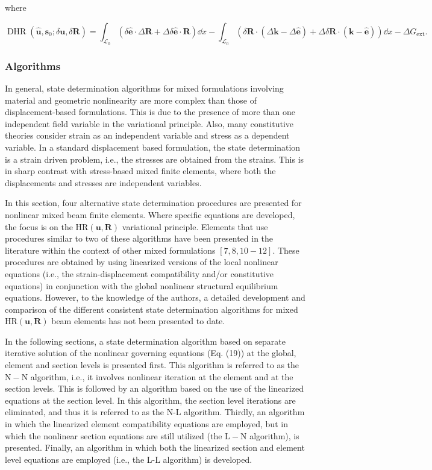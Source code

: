 where

$$
\operatorname{DHR}(\hat{\bm{u}}, \bm{s}_0 ; \delta \bm{u}, \delta \mathbf{R})=\int_{\mathscr{L}_0}(\delta \hat{\bm{e}} \cdot \Delta \mathbf{R}+\Delta \delta \hat{\bm{e}} \cdot \mathbf{R}) \dd x -\int_{\mathscr{L}_0}(\delta \mathbf{R} \cdot(\Delta \mathbf{k}-\Delta \hat{\bm{e}})+\Delta \delta \mathbf{R} \cdot(\mathbf{k}-\hat{\bm{e}})) \dd x-\Delta G_{\mathrm{ext}} .
$$

\subsubsection{Algorithms}

In general, state determination algorithms for mixed formulations involving material and geometric nonlinearity are more complex than those of displacement-based formulations. This is due to the presence of more than one independent field variable in the variational principle. Also, many constitutive theories consider strain as an independent variable and stress as a dependent variable. In a standard displacement based formulation, the state determination is a strain driven problem, i.e., the stresses are obtained from the strains. This is in sharp contrast with stress-based mixed finite elements, where both the displacements and stresses are independent variables.

In this section, four alternative state determination procedures are presented for nonlinear mixed beam finite elements. 
Where specific equations are developed, the focus is on the $\mathrm{HR}(\bm{u}, \mathbf{R})$ variational principle. Elements that use procedures similar to two of these algorithms have been presented in the literature within the context of other mixed formulations $[7,8,10-12]$. 
These procedures are obtained by using linearized versions of the local nonlinear equations (i.e., the strain-displacement compatibility and/or constitutive equations) in conjunction with the global nonlinear structural equilibrium equations. However, to the knowledge of the authors, a detailed development and comparison of the different consistent state determination algorithms for mixed $\mathrm{HR}(\bm{u}, \mathbf{R})$ beam elements has not been presented to date.

In the following sections, a state determination algorithm based on separate iterative solution of the nonlinear governing equations (Eq. (19)) at the global, element and section levels is presented first. This algorithm is referred to as the $\mathrm{N}-\mathrm{N}$ algorithm, i.e., it involves nonlinear iteration at the element and at the section levels. This is followed by an algorithm based on the use of the linearized equations at the section level. In this algorithm, the section level iterations are eliminated, and thus it is referred to as the N-L algorithm. Thirdly, an algorithm in which the linearized element compatibility equations are employed, but in which the nonlinear section equations are still utilized (the $\mathrm{L}-\mathrm{N}$ algorithm), is presented. Finally, an algorithm in which both the linearized section and element level equations are employed (i.e., the L-L algorithm) is developed.


